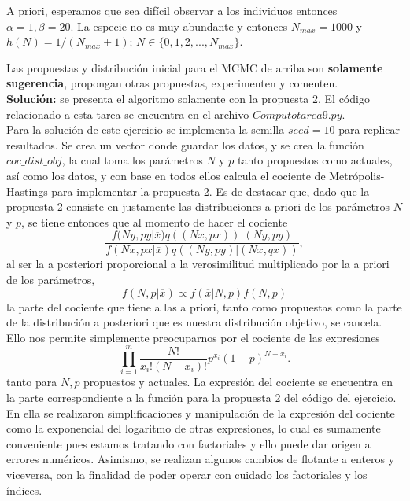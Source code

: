 \documentclass[letterpaper]{article}
\newcommand{\1}{\mathds{1}}
\theoremstyle{definition}
\theoremstyle{definition}
\theoremstyle{definition}
\theoremstyle{definition}
\theoremstyle{definition}
\begin{document}
\begin{itemize}
    A priori, esperamos que sea difícil observar a los individuos entonces $\alpha=1,\beta=20$. La especie no 
    es muy abundante y entonces $N_{max}=1000$ y $h(N)=1/(N_{max}+1)$; $N\in \{0,1,2,...,N_{max}\}$.
    
    Las propuestas y distribución inicial para el MCMC de arriba son \textbf{solamente sugerencia}, propongan otras propuestas, 
    experimenten y comenten.\\

    \textbf{Solución:} se presenta el algoritmo solamente con la propuesta 2. El código relacionado a esta tarea se encuentra en el archivo $Computo tarea 9.py$.\\

    Para la solución de este ejercicio se implementa la semilla $seed=10$ para replicar resultados. Se crea un vector donde guardar los datos, y se crea
    la función $coc\_dist\_obj$, la cual toma los parámetros $N$ y $p$ tanto propuestos como actuales, así como los datos, y con base en todos ellos calcula el cociente 
    de Metrópolis-Hastings para implementar la propuesta 2. Es de destacar que, dado que la propuesta 2 consiste en justamente las distribuciones a priori de los parámetros 
    $N$ y $p$, se tiene entonces que al momento de hacer el cociente 
    \[
    \frac{f(Ny,py|\overline{x})q((Nx,px))|(Ny,py)}{f(Nx,px|\overline{x})q((Ny,py)|(Nx,qx))},    
    \]
    al ser la a posteriori proporcional a la verosimilitud multiplicado por la a priori de los parámetros,
    \[
        f(N,p|\overline{x})\propto f(\overline{x}|N,p)f(N,p)    
    \]
    la parte del cociente que tiene a las a priori, tanto como propuestas como la parte de la distribución a posteriori que es nuestra distribución objetivo, se cancela.
    Ello nos permite simplemente preocuparnos por el cociente de las expresiones 
    \[
        \prod_{i=1}^{m}\frac{N!}{x_i!(N-x_i)!}p^{x_i}(1-p)^{N-x_i}.
    \]
    tanto para $N,p$ propuestos y actuales. La expresión del cociente se encuentra en la 
    parte correspondiente a la función para la propuesta 2 del código del ejercicio. En ella se realizaron simplificaciones y manipulación de la expresión del cociente como la exponencial del 
    logaritmo de otras expresiones, lo cual es sumamente conveniente pues estamos tratando con factoriales y ello puede dar origen a errores numéricos. Asimismo, se realizan 
    algunos cambios de flotante a enteros y viceversa, con la finalidad de poder operar con cuidado los factoriales y los índices.
    \newline


\end{itemize}
\end{document}
